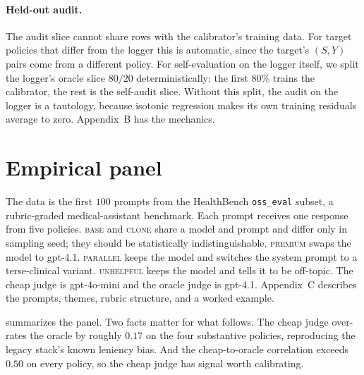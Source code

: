 \documentclass[11pt]{article}
\begin{document}
\paragraph{Held-out audit.}
The audit slice cannot share rows with the calibrator's training data.
For target policies that differ from the logger this is automatic,
since the target's $(S, Y)$ pairs come from a different policy. For
self-evaluation on the logger itself, we split the logger's oracle
slice $80/20$ deterministically: the first $80\%$ trains the
calibrator, the rest is the self-audit slice. Without this split, the
audit on the logger is a tautology, because isotonic regression makes
its own training residuals average to zero. Appendix~B has the
mechanics.

\section{Empirical panel}

The data is the first $100$ prompts from the HealthBench
\texttt{oss\_eval} subset, a rubric-graded medical-assistant benchmark.
Each prompt receives one response from five policies. \textsc{base}
and \textsc{clone} share a model and prompt and differ only in
sampling seed; they should be statistically indistinguishable.
\textsc{premium} swaps the model to gpt-4.1. \textsc{parallel} keeps
the model and switches the system prompt to a terse-clinical variant.
\textsc{unhelpful} keeps the model and tells it to be off-topic.
The cheap judge is gpt-4o-mini and the oracle judge is gpt-4.1.
Appendix~C describes the prompts, themes, rubric structure, and a
worked example.

 summarizes the panel. Two facts matter for what
follows. The cheap judge over-rates the oracle by roughly $0.17$ on
the four substantive policies, reproducing the legacy stack's known
leniency bias. And the cheap-to-oracle correlation exceeds $0.50$ on
every policy, so the cheap judge has signal worth calibrating.
\end{document}
